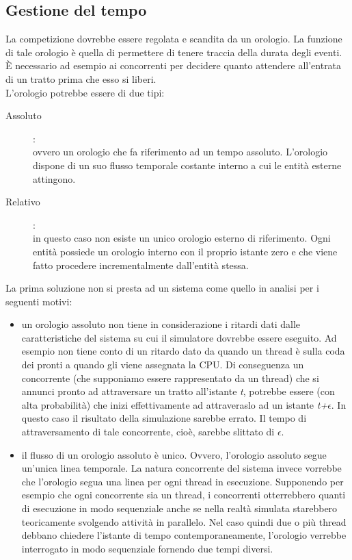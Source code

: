 \label{analisi_soluzioni}
\subsection{Gestione del tempo}
\label{tempo}
La competizione dovrebbe essere regolata e scandita da un orologio. La funzione di tale orologio è quella di permettere
di tenere traccia della durata degli eventi. \`{E} necessario ad esempio ai concorrenti per decidere quanto attendere all'entrata
di un tratto prima che esso si liberi.\\
L'orologio potrebbe essere di due tipi:
\begin{description}
\item[Assoluto]:\\
ovvero un orologio che fa riferimento ad un tempo assoluto. L'orologio dispone di un suo flusso temporale costante 
interno a cui le entità esterne attingono.
\item[Relativo]:\\
in questo caso non esiste un unico orologio esterno di riferimento. Ogni entità possiede un orologio interno con il proprio istante
zero e che viene fatto procedere incrementalmente dall'entità stessa.
\end{description}
La prima soluzione non si presta ad un sistema come quello in analisi per i seguenti motivi:
\begin{itemize}
\item un orologio assoluto non tiene in considerazione i ritardi dati dalle caratteristiche del sistema su cui il simulatore dovrebbe
essere eseguito. Ad esempio non tiene conto di un ritardo dato da quando un thread è sulla coda dei pronti a quando gli viene assegnata la CPU.
Di conseguenza un concorrente (che supponiamo essere rappresentato da un thread) che si annunci pronto ad attraversare un tratto all'istante
\emph{t}, potrebbe essere (con alta probabilità) che inizi effettivamente ad attraveraslo ad un istante \emph{t+$\epsilon$}. In questo caso
il risultato della simulazione sarebbe errato. Il tempo di attraversamento di tale concorrente, cioè, sarebbe slittato di $\epsilon$.
\item il flusso di un orologio assoluto è unico. Ovvero, l'orologio assoluto segue un'unica linea temporale. La natura concorrente del sistema
invece vorrebbe che l'orologio segua una linea per ogni thread in esecuzione. Supponendo per esempio che ogni concorrente sia un thread,
i concorrenti otterrebbero quanti di esecuzione in modo sequenziale anche se nella realtà simulata starebbero teoricamente svolgendo
attività in parallelo. Nel caso quindi due o più thread debbano chiedere l'istante di tempo contemporaneamente, 
l'orologio verrebbe interrogato in modo sequenziale fornendo due tempi diversi.
\end{itemize}
